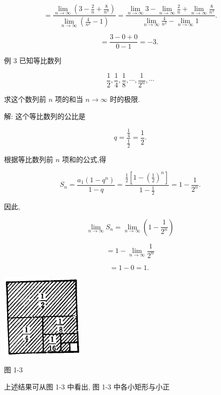 \documentclass[lang=cn,newtx,10pt,scheme=chinese]{elegantbook}
\begin{document}
\[
= \frac{\mathop{\lim }\limits_{{n \rightarrow \infty }}\left( {3 - \frac{2}{n} + \frac{8}{{n}^{2}}}\right) }{\mathop{\lim }\limits_{{n \rightarrow \infty }}\left( {\frac{4}{{n}^{2}} - 1}\right) } = \frac{\mathop{\lim }\limits_{{n \rightarrow \infty }}3 - \mathop{\lim }\limits_{{n \rightarrow \infty }}\frac{2}{n} + \mathop{\lim }\limits_{{n \rightarrow \infty }}\frac{8}{{n}^{2}}}{\mathop{\lim }\limits_{{n \rightarrow \infty }}\frac{4}{{n}^{2}} - \mathop{\lim }\limits_{{n \rightarrow \infty }}1}.
\]

\[
= \frac{3 - 0 + 0}{0 - 1} = - 3\text{. }
\]

例 3 已知等比数列

\[
\frac{1}{2},\frac{1}{4},\frac{1}{8},\cdots ,\frac{1}{{2}^{n}},\cdots
\]

求这个数列前 \(n\) 项的和当 \(n \rightarrow \infty\) 时的极限.

解: 这个等比数列的公比是

\[
q = \frac{\frac{1}{4}}{\frac{1}{2}} = \frac{1}{2}.
\]

根据等比数列前 \(n\) 项和的公式,得

\[
{S}_{n} = \frac{{a}_{1}\left( {1 - {q}^{n}}\right) }{1 - q} = \frac{\frac{1}{2}\left\lbrack {1 - {\left( \frac{1}{2}\right) }^{n}}\right\rbrack }{1 - \frac{1}{2}} = 1 - \frac{1}{{2}^{n}}.
\]

因此,

\[
\mathop{\lim }\limits_{{n \rightarrow \infty }}{S}_{n} = \mathop{\lim }\limits_{{n \rightarrow \infty }}\left( {1 - \frac{1}{{2}^{n}}}\right)
\]

\[
= 1 - \mathop{\lim }\limits_{{n \rightarrow \infty }}\frac{1}{{2}^{n}}
\]

\[
= 1 - 0 = 1\text{. }
\]

\begin{center}
	\includegraphics[max width=0.3\textwidth]{images/01912c18-5c3f-733d-b775-749ba9897a9d_14_791114.jpg}
\end{center}

图 1-3

上述结果可从图 1-3 中看出, 图 1-3 中各小矩形与小正
\end{document}
